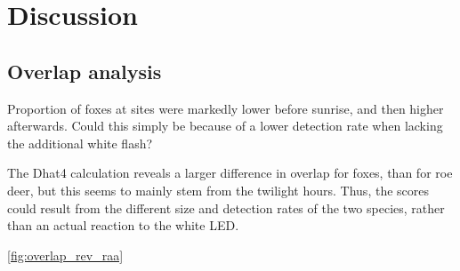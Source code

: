 \chapter{Discussion}







\section{Overlap analysis}

Proportion of foxes at sites were markedly lower before sunrise, and then higher afterwards. 
Could this simply be because of a lower detection rate when lacking the additional white flash? 

The Dhat4 calculation reveals a larger difference in overlap for foxes, than for roe deer, but this seems to mainly stem from the twilight hours. Thus, the scores could result from the different size and detection rates of the two species, rather than an actual reaction to the white LED.



\vref{fig:overlap_rev_raa}









